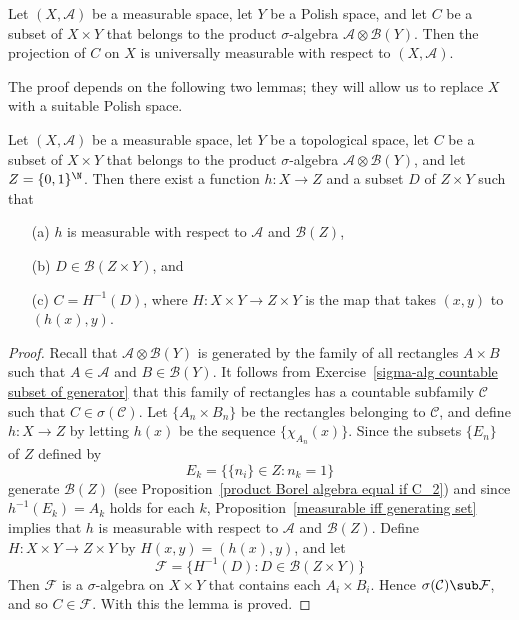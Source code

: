 \begin{proposition}\label{projection universally measurable}
Let $(X,\mathcal{A})$ be a measurable space, let $Y$ be a Polish space, and let $C$ be a subset of $X\times Y$ that belongs to the product $\sigma$-algebra $\mathcal{A}\otimes\mathcal{B}(Y)$. Then the projection of $C$ on $X$ is universally measurable with respect to $(X,\mathcal{A})$.
\end{proposition}
The proof depends on the following two lemmas; they will allow us to replace $X$ with a suitable Polish space.
\begin{lemma}\label{product measurable transfer to Polish}
Let $(X,\mathcal{A})$ be a measurable space, let $Y$ be a topological space, let $C$ be a subset of $X\times Y$ that belongs to the product $\sigma$-algebra $\mathcal{A}\otimes\mathcal{B}(Y)$, and let $Z=\{0,1\}^\N$. Then there exist a function $h:X\to Z$ and a subset $D$ of $Z\times Y$ such that
\begin{itemize}
\item[(a)] $h$ is measurable with respect to $\mathcal{A}$ and $\mathcal{B}(Z)$,
\item[(b)] $D\in\mathcal{B}(Z\times Y)$, and
\item[(c)] $C=H^{-1}(D)$, where $H:X\times Y\to Z\times Y$ is the map that takes $(x,y)$ to $(h(x),y)$.
\end{itemize}
\end{lemma}
\begin{proof}
Recall that $\mathcal{A}\otimes\mathcal{B}(Y)$ is generated by the family of all rectangles $A\times B$ such that $A\in\mathcal{A}$ and $B\in\mathcal{B}(Y)$. It follows from Exercise~\ref{sigma-alg countable subset of generator} that this family of rectangles has a countable subfamily $\mathcal{C}$ such that $C\in\sigma(\mathcal{C})$. Let $\{A_n\times B_n\}$ be the rectangles belonging to $\mathcal{C}$, and define $h:X\to Z$ by letting $h(x)$ be the sequence $\{\chi_{A_n}(x)\}$. Since the subsets $\{E_n\}$ of $Z$ defined by
\[E_k=\{\{n_i\}\in Z:n_k=1\}\]
generate $\mathcal{B}(Z)$ (see Proposition~\ref{product Borel algebra equal if C_2}) and since $h^{-1}(E_k)=A_k$ holds for each $k$, Proposition~\ref{measurable iff generating set} implies that $h$ is measurable with respect to $\mathcal{A}$ and $\mathcal{B}(Z)$. Define $H:X\times Y\to Z\times Y$ by $H(x,y)=(h(x),y)$, and let
\[\mathcal{F}=\{H^{-1}(D):D\in\mathcal{B}(Z\times Y)\}\]
Then $\mathcal{F}$ is a $\sigma$-algebra on $X\times Y$ that contains each $A_i\times B_i$. Hence $\sigma(\mathcal{C})\sub\mathcal{F}$, and so $C\in\mathcal{F}$. With this the lemma is proved.
\end{proof}
